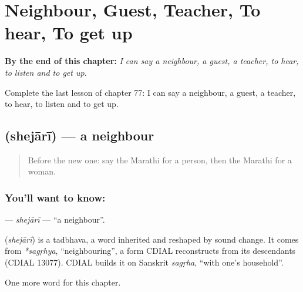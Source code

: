 
\chapter{Neighbour, Guest, Teacher, To hear, To get up}
\label{ch:mr-neighbour-guest-teacher-to-hear-to-get-up}

\begin{chapteropening}
\textbf{By the end of this chapter:} \emph{I can say a neighbour, a guest, a teacher, to hear, to listen and to get up.}

Complete the last lesson of chapter 77: I can say a neighbour, a guest, a teacher, to hear, to listen and to get up.
\end{chapteropening}

\section[\texorpdfstring{\mr{शेजारी} (shejārī)}{शेजारी (shejārī)}]{ (shejārī) — a neighbour}

\label{lesson:MR-C77-shejari}



\begin{quote}
Before the new one: say the Marathi for a person, then the Marathi for a woman.
\end{quote}

\subsection*{You'll want to know: }
\textbf{} — \emph{shejārī} — \textquotedblleft{}a neighbour\textquotedblright{}.

\begin{cousinweb}
\textbf{} (\emph{shejārī}) is a tadbhava, a word inherited and reshaped by sound change. It comes from \emph{*sagṛhya}, \textquotedblleft{}neighbouring\textquotedblright{}, a form CDIAL reconstructs from its descendants (CDIAL 13077). CDIAL builds it on Sanskrit \emph{sagṛha}, \textquotedblleft{}with one's household\textquotedblright{}.
\end{cousinweb}

\begin{grammarlens}[title={What you've built}]
One more word for this chapter.
\end{grammarlens}

